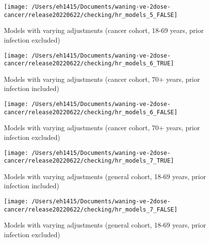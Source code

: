 \documentclass[
  10,
]{article}
\begin{document}
\begin{landscape}
\begin{figure}[H]
{\centering \texttt{[image: /Users/eh1415/Documents/waning-ve-2dose-cancer/release20220622/checking/hr\_models\_5\_FALSE]} 

}

\caption{Models with varying adjustments (cancer cohort, 18-69 years, prior infection excluded)}\label{fig:unnamed-chunk-11}
\end{figure}

\begin{figure}[H]

{\centering \texttt{[image: /Users/eh1415/Documents/waning-ve-2dose-cancer/release20220622/checking/hr\_models\_6\_TRUE]} 

}

\caption{Models with varying adjustments (cancer cohort, 70+ years, prior infection included)}\label{fig:unnamed-chunk-12}
\end{figure}

\begin{figure}[H]

{\centering \texttt{[image: /Users/eh1415/Documents/waning-ve-2dose-cancer/release20220622/checking/hr\_models\_6\_FALSE]} 

}

\caption{Models with varying adjustments (cancer cohort, 70+ years, prior infection excluded)}\label{fig:unnamed-chunk-13}
\end{figure}

\begin{figure}[H]

{\centering \texttt{[image: /Users/eh1415/Documents/waning-ve-2dose-cancer/release20220622/checking/hr\_models\_7\_TRUE]} 

}

\caption{Models with varying adjustments (general cohort, 18-69 years, prior infection included)}\label{fig:unnamed-chunk-14}
\end{figure}

\begin{figure}[H]

{\centering \texttt{[image: /Users/eh1415/Documents/waning-ve-2dose-cancer/release20220622/checking/hr\_models\_7\_FALSE]} 

}

\caption{Models with varying adjustments (general cohort, 18-69 years, prior infection excluded)}\label{fig:unnamed-chunk-15}
\end{figure}


\end{landscape}
\end{document}
